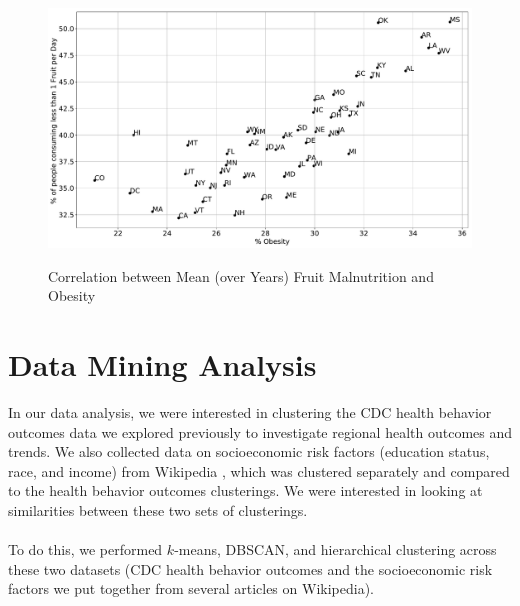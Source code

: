 \documentclass{article}
\begin{document}
\begin{figure}[h]
\centering
\caption{Correlation between Mean (over Years) Fruit Malnutrition and Obesity}
\includegraphics[width=\linewidth]{images/exploration_fruit_malnutrition_vs_obesity.pdf}
\label{fig:fruitMalnutritionVsObesity}
\end{figure}
\section{Data Mining Analysis}
\label{dataanalysis}
In our data analysis, we were interested in clustering the CDC health behavior outcomes data we explored previously to investigate regional health outcomes and trends. We also collected data on socioeconomic risk factors (education status, race, and income) from Wikipedia \cite{demodata, eduratesdata, incomedata}, which was clustered separately and compared to the health behavior outcomes clusterings. 
We were interested in looking at similarities between these two sets of clusterings.
\\\\
To do this, we performed $k$-means, DBSCAN, and hierarchical clustering across these two datasets (CDC health behavior outcomes and the socioeconomic risk factors we put together from several articles on Wikipedia).
\end{document}
